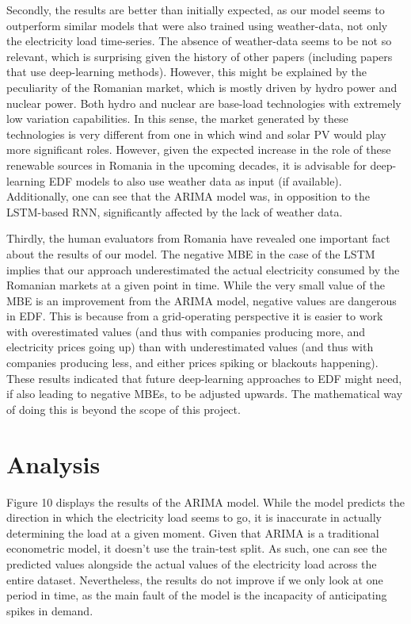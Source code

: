 \documentclass[10pt,twocolumn,letterpaper]{article}
\begin{document}
Secondly, the results are better than initially expected, as our model seems to outperform similar models that were also trained using weather-data, not only the electricity load time-series. The absence of weather-data seems to be not so relevant, which is surprising given the history of other papers (including papers that use deep-learning methods). However, this might be explained by the peculiarity of the Romanian market, which is mostly driven by hydro power and nuclear power. Both hydro and nuclear are base-load technologies with extremely low variation capabilities. In this sense, the market generated by these technologies is very different from one in which wind and solar PV would play more significant roles. However, given the expected increase in the role of these renewable sources in Romania in the upcoming decades, it is advisable for deep-learning EDF models to also use weather data as input (if available). Additionally, one can see that the ARIMA model was, in opposition to the LSTM-based RNN, significantly affected by the lack of weather data.

Thirdly, the human evaluators from Romania have revealed one important fact about the results of our model. The negative MBE in the case of the LSTM implies that our approach underestimated the actual electricity consumed by the Romanian markets at a given point in time. While the very small value of the MBE is an improvement from the ARIMA model, negative values are dangerous in EDF. This is because from a grid-operating perspective it is easier to work with overestimated values (and thus with companies producing more, and electricity prices going up) than with underestimated values (and thus with companies producing less, and either prices spiking or blackouts happening). These results indicated that future deep-learning approaches to EDF might need, if also leading to negative MBEs, to be adjusted upwards. The mathematical way of doing this is beyond the scope of this project.


\section{Analysis}

Figure 10 displays the results of the ARIMA model. While the model predicts the direction in which the electricity load seems to go, it is inaccurate in actually determining the load at a given moment.  Given that ARIMA is a traditional econometric model, it doesn't use the train-test split. As such, one can see the predicted values alongside the actual values of the electricity load across the entire dataset. Nevertheless, the results do not improve if we only look at one period in time, as the main fault of the model is the incapacity of anticipating spikes in demand. 
\end{document}
